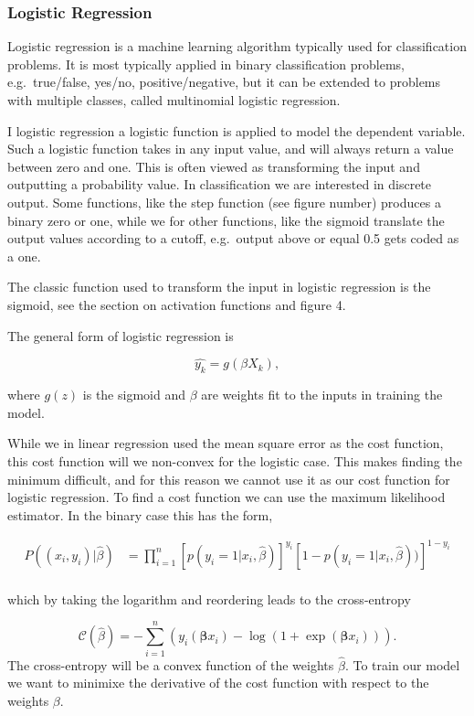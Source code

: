 \documentclass[11pt]{article}
\begin{document}
\hypertarget{logistic-regression}{%
\subsubsection{Logistic Regression}\label{logistic-regression}}

Logistic regression is a machine learning algorithm typically used for
classification problems. It is most typically applied in binary
classification problems, e.g.~true/false, yes/no, positive/negative, but
it can be extended to problems with multiple classes, called multinomial
logistic regression.

I logistic regression a logistic function is applied to model the
dependent variable. Such a logistic function takes in any input value,
and will always return a value between zero and one. This is often
viewed as transforming the input and outputting a probability value. In
classification we are interested in discrete output. Some functions,
like the step function (see figure number) produces a binary zero or
one, while we for other functions, like the sigmoid translate the output
values according to a cutoff, e.g.~output above or equal 0.5 gets coded
as a one.

The classic function used to transform the input in logistic regression
is the sigmoid, see the section on activation functions and figure 4.

The general form of logistic regression is

\[
\hat{y_k} = g(\beta X_k),
\]

where \(g(z)\) is the sigmoid and \(\beta\) are weights fit to the
inputs in training the model.

While we in linear regression used the mean square error as the cost
function, this cost function will we non-convex for the logistic case.
This makes finding the minimum difficult, and for this reason we cannot
use it as our cost function for logistic regression. To find a cost
function we can use the maximum likelihood estimator. In the binary case
this has the form,


\begin{align*}
P((x_i,y_i)|\hat{\beta})& = \prod_{i=1}^n \left[p(y_i=1|x_i,\hat{\beta})\right]^{y_i}\left[1-p(y_i=1|x_i,\hat{\beta}))\right]^{1-y_i}\nonumber \\
\end{align*}


which by taking the logarithm and reordering leads to the cross-entropy

\[
\mathcal{C}(\hat{\beta})=-\sum_{i=1}^n  \left(y_i(\boldsymbol{\beta}x_i) -\log{(1+\exp{(\boldsymbol{\beta}x_i)})}\right).
\] The cross-entropy will be a convex function of the weights
\(\hat{\beta}\). To train our model we want to minimixe the derivative
of the cost function with respect to the weights \(\beta\).
\end{document}
